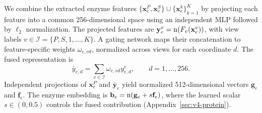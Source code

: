 We combine the extracted enzyme features
$\{\mathbf{x}_e^{P},\mathbf{x}_e^{S}\}\cup\{\mathbf{x}_e^{k}\}_{k=1}^{K}$
by projecting each feature into a common 256-dimensional space using an
independent MLP followed by $\ell_2$ normalization. The projected features are
$\mathbf{y}_e^{v}=\operatorname{n}(F_v(\mathbf{x}_e^{v}))$, with view labels
$v\in\mathcal I=\{P,S,1,\ldots,K\}$.
A gating network maps their concatenation to feature-specific weights
$\omega_{e,vd}$, normalized across views for each coordinate $d$.
The fused representation is
\begin{equation}
 \bar y_{e,d}=\sum_{v\in\mathcal I}\omega_{e,vd}y_{e,d}^{v},
 \qquad d=1,\ldots,256.
 \label{eq:paper-protein}
\end{equation}
Independent projections of $\mathbf{x}_e^{P}$ and $\bar{\mathbf{y}}_e$ yield
normalized 512-dimensional vectors $\mathbf{g}_e$ and $\mathbf{f}_e$.
The enzyme embedding is $\mathbf{b}_e=\operatorname{n}(\mathbf{g}_e+s\mathbf{f}_e)$,
where the learned scalar $s\in(0,0.5)$ controls the fused contribution
(Appendix~\ref{sec:v4-protein}).
